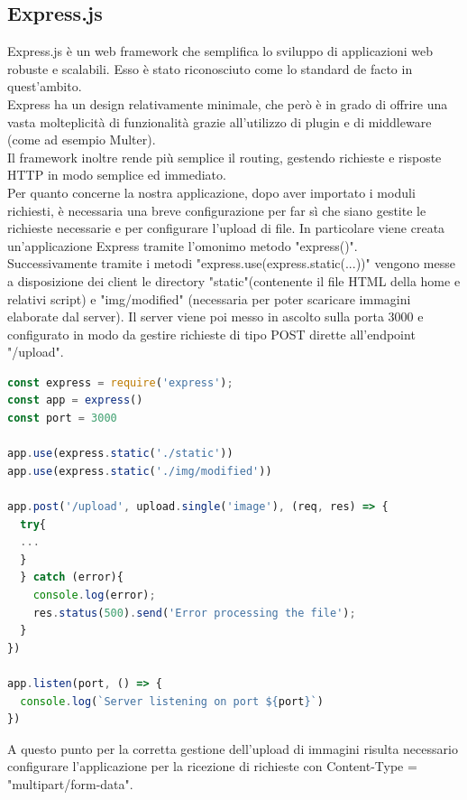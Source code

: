 \subsection{Express.js}
Express.js è un web framework che semplifica lo sviluppo di applicazioni web robuste e scalabili. Esso è stato riconosciuto come lo standard de facto in quest'ambito.
\\Express ha un design relativamente minimale, che però è in grado di offrire una vasta molteplicità di funzionalità grazie all'utilizzo di plugin e di middleware (come ad esempio Multer).  
\\Il framework inoltre rende più semplice il routing, gestendo richieste e risposte HTTP in modo semplice ed immediato.
\\Per quanto concerne la nostra applicazione, dopo aver importato i moduli richiesti, è necessaria una breve configurazione per far sì che siano gestite le richieste necessarie e per configurare l'upload di file.
In particolare viene creata un'applicazione Express tramite l'omonimo metodo "express()".
\\Successivamente tramite i metodi "express.use(express.static(...))" vengono messe a disposizione dei client le directory "static"(contenente il file HTML della home e relativi script) e "img/modified" (necessaria per poter scaricare immagini elaborate dal server).
Il server viene poi messo in ascolto sulla porta 3000 e configurato in modo da gestire richieste di tipo POST dirette all'endpoint "/upload".
\newpage
\begin{lstlisting}[language=JavaScript, caption={Configurazione Express.js}, showstringspaces=false]
const express = require('express');
const app = express()
const port = 3000
    
app.use(express.static('./static'))
app.use(express.static('./img/modified'))

app.post('/upload', upload.single('image'), (req, res) => {
  try{
  ...
  }
  } catch (error){
    console.log(error);
    res.status(500).send('Error processing the file');
  }
})

app.listen(port, () => {
  console.log(`Server listening on port ${port}`)
})
\end{lstlisting}
A questo punto per la corretta gestione dell'upload di immagini risulta necessario configurare l'applicazione per la ricezione di richieste con Content-Type = "multipart/form-data".

